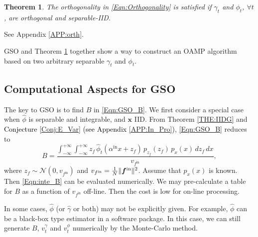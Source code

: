 \documentclass[journal]{IEEEtran}
\newcommand{\mr}{\mathrm}
\newcommand{\BE}{\begin{equation}}
\newcommand{\EE}{\end{equation}}
\renewcommand{\bf}{\bm}
\renewcommand{\cal}{\mathcal}
\newtheorem{theorem}{Theorem}
\newcommand{\LL}[1]{\textcolor{black}{#1}}
\begin{document}
\begin{theorem}\label{THE:orth}
The orthogonality in \eqref{Eqn:Orthogonality} is satisfied if $\gamma_t$ and $\phi_t$, $\forall t$, are orthogonal and separable-IID.
\end{theorem}

\begin{IEEEproof}
See Appendix \ref{APP:orth}.
\end{IEEEproof}

GSO and Theorem \ref{THE:orth} together show a way to construct an OAMP algorithm based on two arbitrary separable $\gamma_t$ and $\phi_t$. %

\subsection{Computational Aspects for GSO}\label{Sec:B_methods}
The key to GSO is to find $B$ in \eqref{Eqn:GSO_B}. We first consider a special case when $\hat{\phi}$ is separable and integrable, and $\bf{x}$ IID. From Theorem \ref{THE:IIDG} and \LL{Conjecture \ref{Conj:E_Var} (see Appendix \ref{APP:In_Pro})}, \eqref{Eqn:GSO_B} reduces to
\BE\label{Eqn:inte_B}
\!\!\!B\!=\!\frac{\int_{-\infty}^{+\infty}\int_{-\infty}^{+\infty} z_f\,\hat{\phi}_t(\alpha^{\mr{in}}x\!+\!z_f)\,p_{z_f}(z_f)\,p_x(x) \,d z_f\, dx}{v_{f^{\mr{in}}}},
\EE
where $z_f\sim \cal{N}(0, v_{f^{\mr{in}}})$ and $v_{f^{\mr{in}}}=\frac{1}{N}\|\bf{f}^{\rm in}\|^2$. Assume that $p_x(x)$ is known. Then \eqref{Eqn:inte_B} can be evaluated numerically. We may pre-calculate a table for $B$ as a function of $v_{f^{\mr{in}}}$ off-line. Then the cost is low for on-line processing.  


In some cases, $\hat{\phi}$ (or $\hat{\gamma}$ or both) may not be explicitly given. For example, $\hat{\phi}$ can be a black-box type estimator in a software package. In this case, we can still generate $B$, $v^{\gamma}_t$ and $v^{\phi}_t$ numerically by the Monte-Carlo method. %
\end{document}
